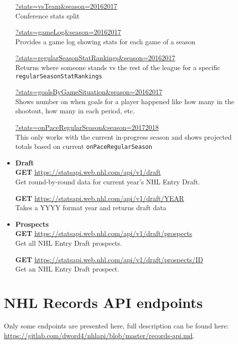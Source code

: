 \documentclass[11pt]{article}
\begin{document}
\begin{itemize}
        \url{?stats=vsTeam&season=20162017} \\
        Conference stats split

        \url{?stats=gameLog&season=20162017} \\
        Provides a game log showing stats for each game of a season

        \url{?stats=regularSeasonStatRankings&season=20162017} \\
        Returns where someone stands vs the rest of the league for a specific \texttt{regularSeasonStatRankings}

        \url{?stats=goalsByGameSituation&season=20162017} \\
        Shows number on when goals for a player happened like how many in the shootout, how many in each period, etc.

        \url{?stats=onPaceRegularSeason&season=20172018} \\
        This only works with the current in-progress season and shows projected totals based on current \texttt{onPaceRegularSeason}

        \item \textbf{Draft} \\
        \textbf{GET} \url{https://statsapi.web.nhl.com/api/v1/draft} \\
        Get round-by-round data for current year's NHL Entry Draft.

        \textbf{GET} \url{https://statsapi.web.nhl.com/api/v1/draft/YEAR} \\
        Takes a YYYY format year and returns draft data

        \item \textbf{Prospects} \\
        \textbf{GET} \url{https://statsapi.web.nhl.com/api/v1/draft/prospects} \\
        Get all NHL Entry Draft prospects.

        \textbf{GET} \url{https://statsapi.web.nhl.com/api/v1/draft/prospects/ID} \\
        Get an NHL Entry Draft prospect.

    \end{itemize}


    \section{NHL Records API endpoints} \label{sec:nhl_records}

    Only some endpoints are presented here, full description can be found here: \url{https://gitlab.com/dword4/nhlapi/blob/master/records-api.md}.
\end{document}
